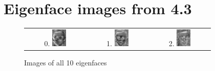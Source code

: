 \documentclass[10pt,a4paper]{article}
\begin{document}
\section{Eigenface images from 4.3}
\begin{figure}[h!]
  \caption{Images of all 10 eigenfaces}
  \centering
  
  \begin{tabular}{ c c c }
    0. \includegraphics[width=0.25\textwidth]{PrincipalComponent0.jpg} & 1. \includegraphics[width=0.25\textwidth]{PrincipalComponent1.jpg} & 2. \includegraphics[width=0.25\textwidth]{PrincipalComponent2.jpg} \\

\end{tabular}
\end{figure}
\end{document}
